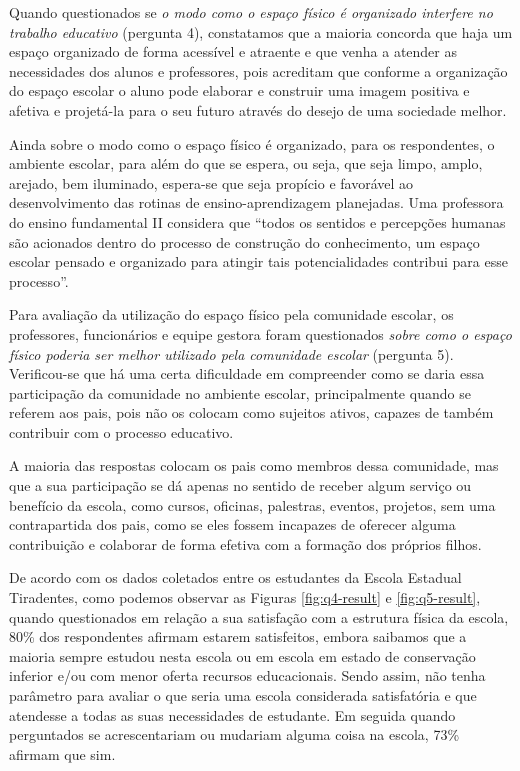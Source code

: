 \begin{refsection}
    Quando questionados se \textit{o modo como o espaço físico é organizado interfere no trabalho educativo} (pergunta 4), constatamos que a maioria concorda que haja um espaço organizado de forma acessível e atraente e que venha a atender as necessidades dos alunos e professores, pois acreditam que conforme a organização do espaço escolar o aluno pode elaborar e construir uma imagem positiva e afetiva e projetá-la para o seu futuro através do desejo de uma sociedade melhor. 

    Ainda sobre o modo como o espaço físico é organizado, para os respondentes, o ambiente escolar, para além do que se espera, ou seja, que seja limpo, amplo, arejado, bem iluminado, espera-se que seja propício e favorável ao desenvolvimento das rotinas de ensino-aprendizagem planejadas. Uma professora do ensino fundamental II considera que “todos os sentidos e percepções humanas são acionados dentro do processo de construção do conhecimento, um espaço escolar pensado e organizado para atingir tais potencialidades contribui para esse processo”. 

    Para avaliação da utilização do espaço físico pela comunidade escolar, os professores, funcionários e equipe gestora foram questionados \textit{sobre como o espaço físico poderia ser melhor utilizado pela comunidade escolar} (pergunta 5). Verificou-se que há uma certa dificuldade em compreender como se daria essa participação da comunidade no ambiente escolar, principalmente quando se referem aos pais, pois não os colocam como sujeitos ativos, capazes de também contribuir com o processo educativo.  

    A maioria das respostas colocam os pais como membros dessa comunidade, mas que a sua participação se dá apenas no sentido de receber algum serviço ou benefício da escola, como cursos, oficinas, palestras, eventos, projetos, sem uma contrapartida dos pais, como se eles fossem incapazes de oferecer alguma contribuição e colaborar de forma efetiva com a formação dos próprios filhos. 

    De acordo com os dados coletados entre os estudantes da Escola Estadual Tiradentes, como podemos observar as Figuras \ref{fig:q4-result} e \ref{fig:q5-result}, quando questionados em relação a sua satisfação com a estrutura física da escola, 80\% dos respondentes afirmam estarem satisfeitos, embora saibamos que a maioria sempre estudou nesta escola ou em escola em estado de conservação inferior e/ou com menor oferta recursos educacionais. Sendo assim, não tenha parâmetro para avaliar o que seria uma escola considerada satisfatória e que atendesse a todas as suas necessidades de estudante. Em seguida quando perguntados se acrescentariam ou mudariam alguma coisa na escola, 73\% afirmam que sim.  


\end{refsection}
